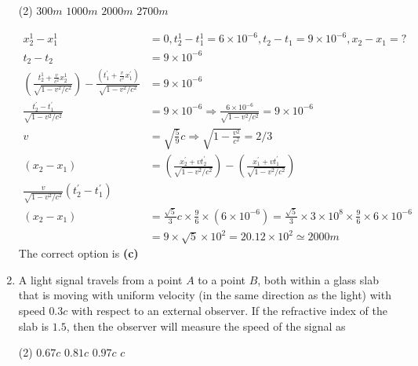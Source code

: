 \begin{enumerate}
\begin{tasks}(2)
	\task[\textbf{A.}] $300 m$
	\task[\textbf{B.}]$1000 m$
	\task[\textbf{C.}]$2000 m$
	\task[\textbf{D.}]$2700 m$
\end{tasks}
\begin{answer}
\begin{align*}
	x_{2}^{1}-x_{1}^{1}&=0, t_{2}^{1}-t_{1}^{1}=6 \times 10^{-6}, t_{2}-t_{1}=9 \times 10^{-6}, x_{2}-x_{1}=?\\
t_{2}-t_{2}&=9 \times 10^{-6}\\
\left(\frac{t_{2}^{1}+\frac{v}{c^{2}} x_{2}^{1}}{\sqrt{1-v^{2} / c^{2}}}\right)-\frac{\left(t_{1}^{\prime}+\frac{v}{c^{2}} x_{1}^{\prime}\right)}{\sqrt{1-v^{2} / c^{2}}}&=9 \times 10^{-6}\\
\frac{t_{2}^{\prime}-t_{1}^{\prime}}{\sqrt{1-v^{2} / c^{2}}}&=9 \times 10^{-6} \Rightarrow \frac{6 \times 10^{-6}}{\sqrt{1-v^{2} / c^{2}}}=9 \times 10^{-6}\\
v&=\sqrt{\frac{5}{9}} c \Rightarrow \sqrt{1-\frac{v^{2}}{c^{2}}}=2 / 3\\
\left(x_{2}-x_{1}\right)&=\left(\frac{x_{2}^{\prime}+v t_{2}^{\prime}}{\sqrt{1-v^{2} / c^{2}}}\right)-\left(\frac{x_{1}^{\prime}+v t_{1}^{\prime}}{\sqrt{1-v^{2} / c^{2}}}\right)\\
\frac{v}{\sqrt{1-v^{2} / c^{2}}}\left(t_{2}^{\prime}-t_{1}^{\prime}\right)\\
\left(x_{2}-x_{1}\right)&=\frac{\sqrt{5}}{3} c \times \frac{9}{6} \times\left(6 \times 10^{-6}\right)=\frac{\sqrt{5}}{3} \times 3 \times 10^{8} \times \frac{9}{6} \times 6 \times 10^{-6}\\
&=9 \times \sqrt{5} \times 10^{2}=20.12 \times 10^{2} \simeq 2000 m
\end{align*}
The correct option is \textbf{(c)}
\end{answer}
	\item A light signal travels from a point $A$ to a point $B$, both within a glass slab that is moving with uniform velocity (in the same direction as the light) with speed $0.3 c$ with respect to an external observer. If the refractive index of the slab is $1.5$, then the observer will measure the speed of the signal as
	{}
\begin{tasks}(2)
	\task[\textbf{A.}] $0.67 c$
	\task[\textbf{B.}]$0.81 c$
	\task[\textbf{C.}]$0.97 c$
	\task[\textbf{D.}] $c$
\end{tasks}
\begin{answer}$\left. \right. $\\
	\begin{minipage}{0.5\textwidth}

\end{minipage}
\end{answer}
\end{enumerate}
